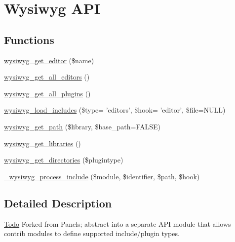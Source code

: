 \hypertarget{group__wysiwyg__api}{
\section{Wysiwyg API}
\label{group__wysiwyg__api}
}
\subsection*{Functions}
\begin{DoxyCompactItemize}
\item 
\hyperlink{group__wysiwyg__api_gaf5c3c86f49f33be930fa6f9b5405a2a6}{wysiwyg\_\-get\_\-editor} (\$name)
\item 
\hyperlink{group__wysiwyg__api_gaf92d888d31e7e1adc2b7d8e763f62b33}{wysiwyg\_\-get\_\-all\_\-editors} ()
\item 
\hyperlink{group__wysiwyg__api_ga4b254b0ad93a619180087364bc415cde}{wysiwyg\_\-get\_\-all\_\-plugins} ()
\item 
\hyperlink{group__wysiwyg__api_gae5880da976120e85f7bb8aeda815b060}{wysiwyg\_\-load\_\-includes} (\$type= 'editors', \$hook= 'editor', \$file=NULL)
\item 
\hyperlink{group__wysiwyg__api_ga328c8919e7a4bb96cf7a19f098313319}{wysiwyg\_\-get\_\-path} (\$library, \$base\_\-path=FALSE)
\item 
\hyperlink{group__wysiwyg__api_ga2918aa22fa830564c63c0df96a625379}{wysiwyg\_\-get\_\-libraries} ()
\item 
\hyperlink{group__wysiwyg__api_ga47660e98db185a3c9de431b94e280977}{wysiwyg\_\-get\_\-directories} (\$plugintype)
\item 
\hyperlink{group__wysiwyg__api_ga81487ce9ea49d7ca7b052bb8f2e8fcc8}{\_\-wysiwyg\_\-process\_\-include} (\$module, \$identifier, \$path, \$hook)
\end{DoxyCompactItemize}


\subsection{Detailed Description}
\begin{Desc}
\item[\hyperlink{todo__todo000094}{Todo}]Forked from Panels; abstract into a separate API module that allows contrib modules to define supported include/plugin types. \end{Desc}


